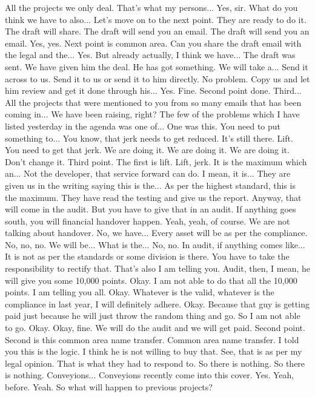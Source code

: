 All the projects we only deal.
That's what my persons...
Yes, sir.
What do you think we have to also...
Let's move on to the next point.
They are ready to do it.
The draft will share.
The draft will send you an email.
The draft will send you an email.
Yes, yes.
Next point is common area.
Can you share the draft email with the legal and the...
Yes.
But already actually, I think we have...
The draft was sent.
We have given him the deal.
He has got something.
We will take a...
Send it across to us.
Send it to us or send it to him directly.
No problem.
Copy us and let him review and get it done through his...
Yes.
Fine.
Second point done.
Third...
All the projects that were mentioned to you from so many emails that has been coming in...
We have been raising, right?
The few of the problems which I have listed yesterday in the agenda was one of...
One was this.
You need to put something to...
You know, that jerk needs to get reduced.
It's still there.
Lift.
You need to get that jerk.
We are doing it.
We are doing it.
We are doing it.
Don't change it.
Third point.
The first is lift.
Lift, jerk.
It is the maximum which an...
Not the developer, that service forward can do.
I mean, it is...
They are given us in the writing saying this is the...
As per the highest standard, this is the maximum.
They have read the testing and give us the report.
Anyway, that will come in the audit.
But you have to give that in an audit.
If anything goes south, you will financial handover happen.
Yeah, yeah, of course.
We are not talking about handover.
No, we have...
Every asset will be as per the compliance.
No, no, no.
We will be...
What is the...
No, no.
In audit, if anything comes like...
It is not as per the standards or some division is there.
You have to take the responsibility to rectify that.
That's also I am telling you.
Audit, then, I mean, he will give you some 10,000 points.
Okay.
I am not able to do that all the 10,000 points.
I am telling you all.
Okay.
Whatever is the valid, whatever is the compliance in last year,
I will definitely adhere.
Okay.
Because that guy is getting paid just because he will just
throw the random thing and go.
So I am not able to go.
Okay.
Okay, fine.
We will do the audit and we will get paid.
Second point.
Second is this common area name transfer.
Common area name transfer.
I told you this is the logic.
I think he is not willing to buy that.
See, that is as per my legal opinion.
That is what they had to respond to.
So there is nothing.
So there is nothing.
Conveyions...
Conveyions recently come into this cover.
Yes.
Yeah, before.
Yeah.
So what will happen to previous projects?
